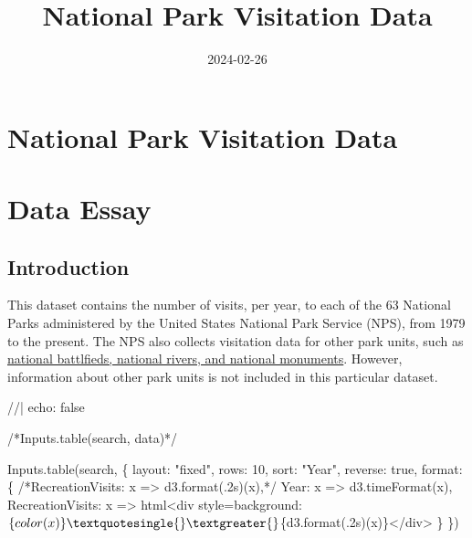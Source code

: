 \documentclass[
  letterpaper,
  DIV=11,
  numbers=noendperiod]{scrartcl}
\title{National Park Visitation Data}
\author{}
\date{2024-02-26}
\newenvironment{Shaded}{\begin{snugshade}}{\end{snugshade}}
\newcommand{\NormalTok}[1]{\textcolor[rgb]{0.00,0.23,0.31}{#1}}
\renewcommand*\contentsname{Table of contents}
\newcommand\contentsname{Table of contents}
\begin{document}
\maketitle

\renewcommand*\contentsname{Table of Contents}
{
\hypersetup{linkcolor=}
\setcounter{tocdepth}{5}
\tableofcontents
}
\section{National Park Visitation
Data}\label{national-park-visitation-data}

\section{Data Essay}

\subsection{Introduction}\label{introduction}

This dataset contains the number of visits, per year, to each of the 63
National Parks administered by the United States National Park Service
(NPS), from 1979 to the present. The NPS also collects visitation data
for other park units, such as
\href{(https://www.nps.gov/aboutus/national-park-system.htm)}{national
battlfieds, national rivers, and national monuments}. However,
information about other park units is not included in this particular
dataset.

\begin{Shaded}
\begin{Highlighting}[]
\NormalTok{//| echo: false}

\NormalTok{/*Inputs.table(search, data)*/}

\NormalTok{Inputs.table(search, \{}
\NormalTok{  layout: "fixed",}
\NormalTok{  rows: 10,}
\NormalTok{  sort: "Year",}
\NormalTok{  reverse: true,}
\NormalTok{  format: \{}
\NormalTok{    /*RecreationVisits: x =\textgreater{} d3.format(\textquotesingle{}.2s\textquotesingle{})(x),*/}
\NormalTok{    Year: x =\textgreater{} d3.timeFormat(x),}
\NormalTok{    RecreationVisits: x =\textgreater{} html\textasciigrave{}\textless{}div style=\textquotesingle{}background:$\{color(x)\}\textquotesingle{}\textgreater{}$\{d3.format(\textquotesingle{}.2s\textquotesingle{})(x)\}\textless{}/div\textgreater{}\textasciigrave{}}
\NormalTok{  \}}
\NormalTok{\})}
\end{Highlighting}
\end{Shaded}
\end{document}

